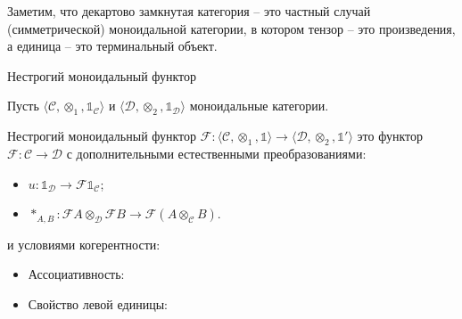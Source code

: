 Заметим, что декартово замкнутая категория -- это частный случай (симметрической) моноидальной категории, в котором тензор -- это произведения, а единица -- это терминальный объект.

\begin{defin} Нестрогий моноидальный функтор

  Пусть $\langle \mathcal{C}, \otimes_1, \mathds{1}_{\mathcal{C}} \rangle$ и $\langle \mathcal{D}, \otimes_2, \mathds{1}_{\mathcal{D}} \rangle$ моноидальные категории.

  Нестрогий моноидальный функтор $\mathcal{F} : \langle \mathcal{C}, \otimes_1, \mathds{1} \rangle \to \langle \mathcal{D}, \otimes_2, \mathds{1}' \rangle$ это функтор
  $\mathcal{F} : \mathcal{C} \to \mathcal{D}$ с дополнительными естественными преобразованиями:

  \begin{itemize}
  \item $u : \mathds{1}_{\mathcal{D}} \to \mathcal{F}\mathds{1}_{\mathcal{C}}$;
  \item $\ast_{A, B} : \mathcal{F}A \otimes_{\mathcal{D}} \mathcal{F}B \to \mathcal{F}(A \otimes_{\mathcal{C}} B)$.
  \end{itemize}

  и условиями когерентности:

  \begin{itemize}
    \item Ассоциативность:


    \item Свойство левой единицы:


\end{itemize}
\end{defin}
